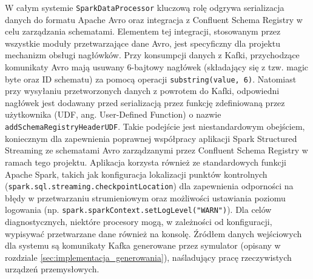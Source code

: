 \begin{enumerate}
W całym systemie \texttt{SparkDataProcessor} kluczową rolę odgrywa serializacja danych do formatu Apache Avro oraz integracja z Confluent Schema Registry w celu zarządzania schematami. Elementem tej integracji, stosowanym przez wszystkie moduły przetwarzające dane Avro, jest specyficzny dla projektu mechanizm obsługi nagłówków. Przy konsumpcji danych z Kafki, przychodzące komunikaty Avro mają usuwany 6-bajtowy nagłówek (składający się z tzw. magic byte oraz ID schematu) za pomocą operacji \texttt{substring(value, 6)}. Natomiast przy wysyłaniu przetworzonych danych z powrotem do Kafki, odpowiedni nagłówek jest dodawany przed serializacją przez funkcję zdefiniowaną przez użytkownika (UDF, ang. User-Defined Function) \cite{spark_udf} o nazwie \texttt{addSchemaRegistryHeaderUDF}. Takie podejście jest niestandardowym obejściem, koniecznym dla zapewnienia poprawnej współpracy aplikacji Spark Structured Streaming ze schematami Avro zarządzanymi przez Confluent Schema Registry \cite{confluent_schema_registry} w ramach tego projektu. Aplikacja korzysta również ze standardowych funkcji Apache Spark, takich jak konfiguracja lokalizacji punktów kontrolnych (\texttt{spark.sql.streaming.checkpointLocation}) dla zapewnienia odporności na błędy w przetwarzaniu strumieniowym oraz możliwości ustawiania poziomu logowania (np. \texttt{spark.sparkContext.setLogLevel("WARN")}). Dla celów diagnostycznych, niektóre procesory mogą, w zależności od konfiguracji, wypisywać przetwarzane dane również na konsolę. Źródłem danych wejściowych dla systemu są komunikaty Kafka generowane przez symulator (opisany w rozdziale \ref{sec:implementacja_generowania}), naśladujący pracę rzeczywistych urządzeń przemysłowych.

\end{enumerate}